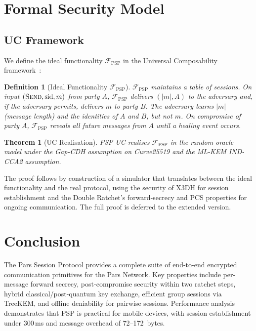 \documentclass[11pt,a4paper]{article}
\newtheorem{definition}{Definition}[section]
\newtheorem{theorem}{Theorem}[section]
\begin{document}
\section{Formal Security Model}
\label{sec:formal}

\subsection{UC Framework}

We define the ideal functionality $\mathcal{F}_{\mathrm{PSP}}$ in the
Universal Composability framework~\cite{canetti2001universally}:

\begin{definition}[Ideal Functionality $\mathcal{F}_{\mathrm{PSP}}$]
    $\mathcal{F}_{\mathrm{PSP}}$ maintains a table of sessions.  On
    input $(\textsc{Send}, \mathrm{sid}, m)$ from party $A$,
    $\mathcal{F}_{\mathrm{PSP}}$ delivers $(|m|, A)$ to the adversary
    and, if the adversary permits, delivers $m$ to party $B$.  The
    adversary learns $|m|$ (message length) and the identities of $A$ and
    $B$, but not $m$.  On compromise of party $A$,
    $\mathcal{F}_{\mathrm{PSP}}$ reveals all future messages from $A$
    until a healing event occurs.
\end{definition}

\begin{theorem}[UC Realisation]
    PSP UC-realises $\mathcal{F}_{\mathrm{PSP}}$ in the random oracle
    model under the Gap-CDH assumption on Curve25519 and the ML-KEM
    IND-CCA2 assumption.
\end{theorem}

The proof follows by construction of a simulator that translates between
the ideal functionality and the real protocol, using the security of X3DH
for session establishment and the Double Ratchet's forward-secrecy and
PCS properties for ongoing communication.  The full proof is deferred to
the extended version.

\section{Conclusion}
\label{sec:conclusion}

The Pars Session Protocol provides a complete suite of end-to-end encrypted
communication primitives for the Pars Network.  Key properties include
per-message forward secrecy, post-compromise security within two ratchet
steps, hybrid classical/post-quantum key exchange, efficient group sessions
via TreeKEM, and offline deniability for pairwise sessions.  Performance
analysis demonstrates that PSP is practical for mobile devices, with session
establishment under 300\,ms and message overhead of 72--172~bytes.
\end{document}
